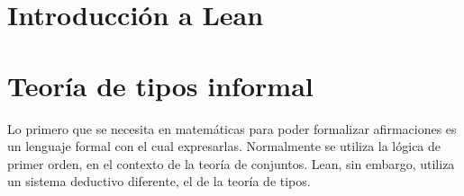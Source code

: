 





\section{Introducción a Lean}
\section{Teoría de tipos informal}

Lo primero que se necesita en matemáticas para poder formalizar afirmaciones es
un lenguaje formal con el cual expresarlas. Normalmente se utiliza la lógica de
primer orden, en el contexto de la teoría de conjuntos. Lean, sin embargo,
utiliza un sistema deductivo diferente, el de la teoría de tipos.

